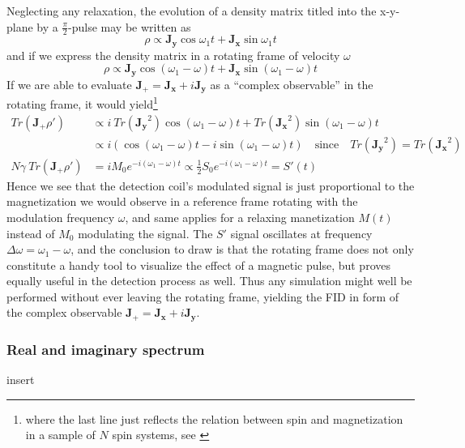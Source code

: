 \documentclass[11.5pt,a4paper]{article}
\begin{document}
Neglecting any relaxation, the evolution of a density matrix titled into the x-y-plane by a $\tfrac{\pi}{2}$-pulse may be written as 
\begin{equation}
 \rho \propto \mathbf{J_y} \cos \omega_1 t + \mathbf{J_x} \sin \omega_1 t
\end{equation}
and if we express the density matrix in a rotating frame of velocity $\omega$
\begin{equation}
 \rho \propto \mathbf{J_y} \cos (\omega_1-\omega) t + \mathbf{J_x} \sin (\omega_1-\omega) t
\end{equation}
If we are able to evaluate $\mathbf{J_+} = \mathbf{J_x} + i \mathbf{J_y}$ as a ``complex observable'' in the rotating frame, it would yield\footnote{where the last line just reflects the relation between spin and magnetization in a sample of $N$ spin systems, see \cite[chap. 4.3.1 Free precession and Faraday detection, p. 125]{ox-nmr}}
\begin{align}
 Tr( \mathbf{J_+} \rho' ) & \propto i\ Tr(\mathbf{J_y}^2) \cos (\omega_1-\omega) t + Tr(\mathbf{J_x}^2) \sin (\omega_1-\omega) t \\
& \propto i ( \cos (\omega_1-\omega) t - i \sin (\omega_1-\omega) t ) \quad \text{since} \quad Tr(\mathbf{J_y}^2) = Tr(\mathbf{J_x}^2) \\
N\gamma \ Tr( \mathbf{J_+} \rho' ) & = i M_0 e^{-i (\omega_1-\omega) t} \propto \frac{1}{2} S_0 e^{-i (\omega_1-\omega) t} = S'(t)
\end{align}
Hence we see that the detection coil's modulated signal is just proportional to the magnetization we would observe in a reference frame rotating with the modulation frequency $\omega$, and same applies for a relaxing manetization $M(t)$ instead of $M_0$ modulating the signal. The $S'$ signal oscillates at frequency $\Delta \omega = \omega_1 - \omega$, and the conclusion to draw is that the rotating frame does not only constitute a handy tool to visualize the effect of a magnetic pulse, but proves equally useful in the detection process as well. Thus any simulation might well be performed without ever leaving the rotating frame, yielding the FID in form of the complex observable $\mathbf{J_+} = \mathbf{J_x} + i \mathbf{J_y}$.

\subsubsection{Real and imaginary spectrum}
insert
\end{document}
